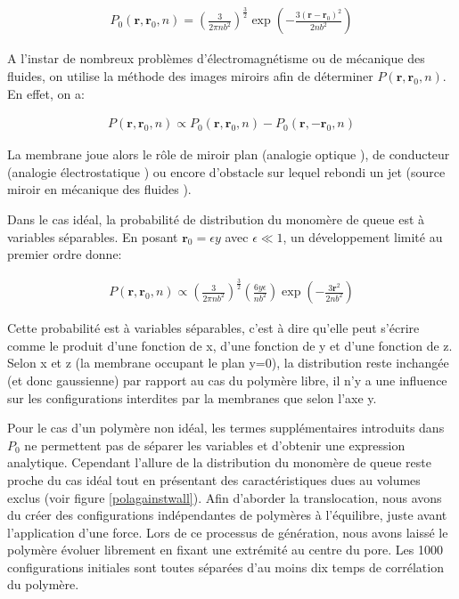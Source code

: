 \begin{eqnarray}
P_0(\textbf{r},\textbf{r}_0,n)=\left(\frac{3}{2\pi n b^2}\right)^\frac{3}{2}\exp\left(-\frac{3(\textbf{r}-\textbf{r}_0)^2}{2 n b^2}\right)
\end{eqnarray}

A l'instar de nombreux problèmes d'électromagnétisme ou de mécanique des fluides, on utilise la méthode des images miroirs afin de déterminer $P(\textbf{r},\textbf{r}_0,n)$. En effet, on a:

\begin{eqnarray}
P(\textbf{r},\textbf{r}_0,n) \propto P_0(\textbf{r},\textbf{r}_0,n)-P_0(\textbf{r},-\textbf{r}_0,n)
\end{eqnarray}

La membrane joue alors le rôle de miroir plan (analogie optique \cite{lipson2011optical}), de conducteur (analogie électrostatique \cite{jackson1999classical}) ou encore d'obstacle sur lequel rebondi un jet (source miroir en mécanique des fluides \cite{kundu2008fluid}).

Dans le cas idéal, la probabilité de distribution du monomère de queue est à variables séparables. En posant $\textbf{r}_0= \epsilon y$ avec $\epsilon \ll 1$, un développement limité au premier ordre donne:

\begin{eqnarray}
P(\textbf{r},\textbf{r}_0,n) \propto \left(\frac{3}{2\pi n b^2}\right)^\frac{3}{2} \left(\frac{6 y \epsilon}{n b^2}\right)\exp\left(-\frac{3\textbf{r}^2}{2 n b^2}\right)
\end{eqnarray}

Cette probabilité est à variables séparables, c'est à dire qu'elle peut s'écrire comme le produit d'une fonction de x, d'une fonction de y  et d'une fonction de z. Selon x et z (la membrane occupant le plan y=0), la distribution reste inchangée (et donc gaussienne) par rapport au cas du polymère libre, il n'y a une influence sur les configurations interdites par la membranes que selon l'axe y.

Pour le cas d'un polymère non idéal, les termes supplémentaires introduits dans $P_0$ ne permettent pas de séparer les variables et d'obtenir une expression analytique. Cependant l'allure de la distribution du monomère de queue reste proche du cas idéal tout en présentant des caractéristiques dues au volumes exclus (voir figure \ref{polagainstwall}). Afin d'aborder la translocation, nous avons du créer des configurations indépendantes de polymères à l'équilibre, juste avant l'application d'une force. Lors de ce processus de génération, nous avons laissé le polymère évoluer librement en fixant une extrémité au centre du pore. Les 1000 configurations initiales sont toutes séparées d'au moins dix temps de corrélation du polymère.


